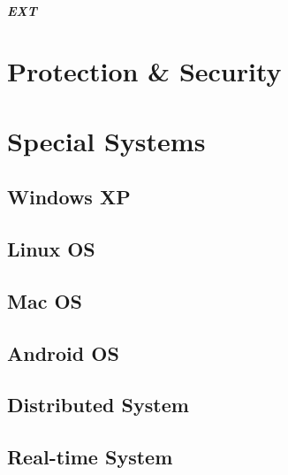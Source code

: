 \paragraph{EXT}

\chapter{Protection \& Security}
\chapter{Special Systems}
\section{Windows XP}
\section{Linux OS}
\section{Mac OS}
\section{Android OS}
\section{Distributed System}
\section{Real-time System}




